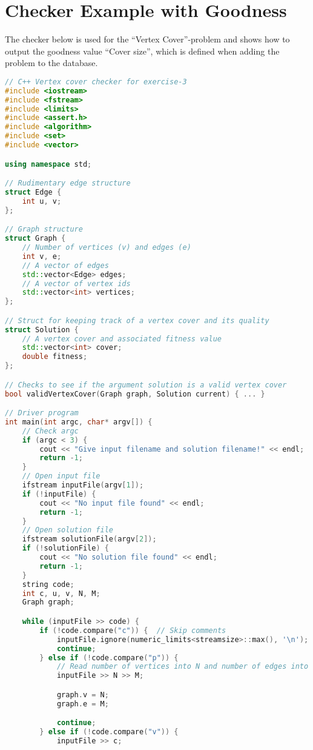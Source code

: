 \section{Checker Example with Goodness}
\label{sec:checker-advanced}
The checker below is used for the ``Vertex Cover''-problem and shows how to output the goodness value ``Cover size'', which is defined when adding the problem to the database.
\begin{lstlisting}[language=c++]
// C++ Vertex cover checker for exercise-3
#include <iostream>
#include <fstream>
#include <limits>
#include <assert.h>
#include <algorithm>
#include <set>
#include <vector>

using namespace std;

// Rudimentary edge structure
struct Edge {
    int u, v;
};

// Graph structure
struct Graph {
    // Number of vertices (v) and edges (e)
    int v, e;
    // A vector of edges
    std::vector<Edge> edges;
    // A vector of vertex ids
    std::vector<int> vertices;
};

// Struct for keeping track of a vertex cover and its quality
struct Solution {
    // A vertex cover and associated fitness value
    std::vector<int> cover;
    double fitness;
};

// Checks to see if the argument solution is a valid vertex cover
bool validVertexCover(Graph graph, Solution current) { ... }

// Driver program
int main(int argc, char* argv[]) {
    // Check argc
    if (argc < 3) {
        cout << "Give input filename and solution filename!" << endl;
        return -1;
    }
    // Open input file
    ifstream inputFile(argv[1]);
    if (!inputFile) {
        cout << "No input file found" << endl;
        return -1;
    }
    // Open solution file
    ifstream solutionFile(argv[2]);
    if (!solutionFile) {
        cout << "No solution file found" << endl;
        return -1;
    }
    string code;
    int c, u, v, N, M;
    Graph graph;

    while (inputFile >> code) {
        if (!code.compare("c")) {  // Skip comments
            inputFile.ignore(numeric_limits<streamsize>::max(), '\n');
            continue;
        } else if (!code.compare("p")) {
            // Read number of vertices into N and number of edges into M
            inputFile >> N >> M;

            graph.v = N;
            graph.e = M;

            continue;
        } else if (!code.compare("v")) {
            inputFile >> c;


\end{lstlisting}
